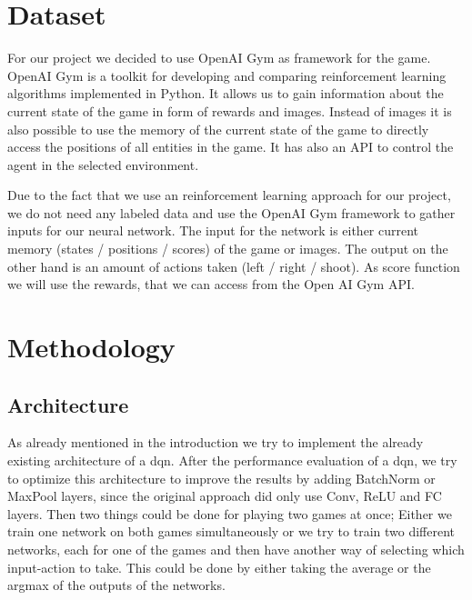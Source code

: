 \documentclass[10pt,twocolumn,letterpaper]{article}
\begin{document}
\section{Dataset}
For our project we decided to use OpenAI Gym as framework for the game. OpenAI Gym is a toolkit for developing and comparing reinforcement learning algorithms implemented in Python. It allows us to gain information about the current state of the game in form of rewards and images. Instead of images it is also possible to use the memory of the current state of the game to directly access the positions of all entities in the game. It has also an API to control the agent in the selected environment.
	
Due to the fact that we use an reinforcement learning approach for our project, we do not need any labeled data and use the OpenAI Gym framework to gather inputs for our neural network. The input for the network is either current memory (states / positions / scores) of the game or images. The output on the other hand is an amount of actions taken (left / right / shoot). As score function we will use the rewards, that we can access from the Open AI Gym API.


\section{Methodology}
\subsection{Architecture}
As already mentioned in the introduction we try to implement the already existing architecture of a \gls{dqn}. After the performance evaluation of a \gls{dqn}, we try to optimize this architecture to improve the results by adding BatchNorm or MaxPool layers, since the original approach did only use Conv, ReLU and FC layers. Then two things could be done for playing two games at once; Either we train one network on both games simultaneously or we try to train two different networks, each for one of the games and then have another way of selecting which input-action to take. This could be done by either taking the average or the argmax of the outputs of the networks.
\end{document}
